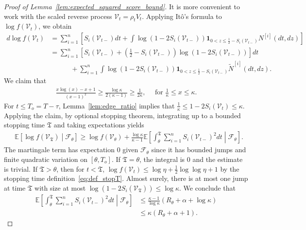 \documentclass[11pt]{article}
\newcommand{\excess}{\alpha}
\newcommand{\btau}{\kappa}
\newcommand{\stopT}{{\boldsymbol{\mathfrak{T}}}}
\newcommand{\sF}{\mathscr{F}}
\newcommand{\uV}{V}
\newcommand{\To}{{T_o}}
\newcommand{\rV}{\mathscr{V}}
\newcommand{\Ni}{N^{[i]}}
\newcommand{\wNi}{\widetilde{N}^{[i]}}
\theoremstyle{named}
\theoremstyle{plain}
\newcommand{\Exs}{\ensuremath{{\mathbb{E}}}}
\newcommand{\brackets}[1]{\left[ #1 \right]}
\newcommand{\parenth}[1]{\left( #1 \right)}
\begin{document}
\begin{proof}[Proof of Lemma~\ref{lem:expected_squared_score_bound}\label{proof_lem:expected_squared_score_bound}]
  It is more convenient to work with the scaled reverse process $\rV_t = \rho_t \uV_t$. Applying It\^o's formula to $\log f (\rV_t)$, we obtain 
  \begin{align*}
    d \log f(\rV_t) &= \sum_{i=1}^n \brackets{S_i(\rV_{t-}) dt + \int \log \parenth{1-2S_i(\rV_{t-})} \mathbf{1}_{0 < z \leq \frac12 - S_i(\rV_{t-})} \Ni(dt, dz) }\\
    &= \sum_{i=1}^n \brackets{S_i(\rV_{t-}) + \parenth{\frac12 - S_i(\rV_{t-})} \log \parenth{1-2S_i(\rV_{t-})}  }  dt \\
    &\quad \quad \quad + \sum_{i=1}^n \int \log \parenth{1-2S_i(\rV_{t-})} \mathbf{1}_{0 < z \leq \frac12 - S_i(\rV_{t-})} \wNi(dt, dz).
  \end{align*}
  We claim that 
  \begin{align}
    \label{eq:claim_lowerbound_xlogx}
    \frac{x\log(x) - x + 1}{(x-1)^2} \geq \frac{\log \btau}{2 (\btau - 1)} \geq \frac{1}{2\btau}, \quad \text{ for } \frac{1}{\btau} \leq x \leq \btau.
  \end{align}
  For $t \leq \To = T-\tau$, Lemma~\ref{lem:edge_ratio} implies that $\frac{1}{\btau} \leq 1-2 S_i(\rV_t) \leq \btau$. Applying the claim, by optional stopping theorem, integrating up to a bounded stopping time $\stopT$ and taking expectations yields
  \begin{align*}
    & \Exs \brackets{\log f(\rV_{\stopT}) \middle| \sF_\theta} \geq \log f(\rV_\theta) + \frac{\log \btau}{\btau - 1} \Exs\brackets{ \int_\theta^{\stopT} \sum_{i=1}^n S_i(\rV_{t-})^2 dt \middle| \sF_\theta}.
  \end{align*}
  The martingale term has expectation $0$ given $\sF_\theta$ since it has bounded jumps and finite quadratic variation on $[\theta, \To]$. If $\stopT = \theta$, the integral is $0$ and the estimate is trivial. If $\stopT > \theta$, then for $t<\stopT$, $\log f(\rV_{t}) \leq \log \eta + \frac12\log\log \eta + 1$ by the stopping time definition~\eqref{eq:def_stopT}. Almost surely, there is at most one jump at time $\stopT$ with size at most $\log(1-2S_i(\rV_{\stopT})) \leq \log \btau$. We conclude that
  \begin{align*}
    \Exs \brackets{\int_\theta^{\stopT} \sum_{i=1}^n S_i(\rV_{t-})^2 dt \middle| \sF_\theta} &\leq \frac{\btau - 1}{\log \btau} \parenth{R_\theta + \excess + \log \btau} \\
    &\leq \btau \parenth{R_\theta + \excess + 1}.
  \end{align*}


\end{proof}
\end{document}
